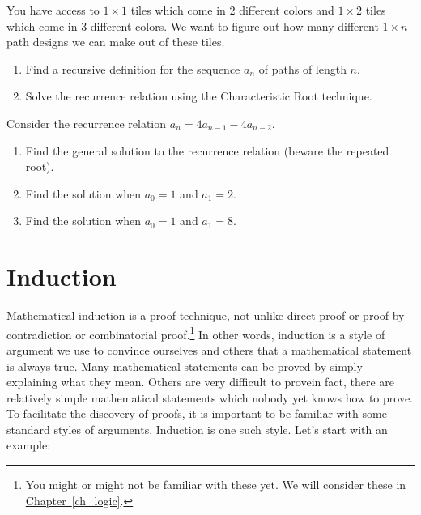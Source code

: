 \documentclass[11pt,]{book}
\theoremstyle{ptxplainnotitle}
\theoremstyle{ptxplaintitle}
\theoremstyle{ptxdefinitionnotitle}
\theoremstyle{ptxdefinitiontitle}
\theoremstyle{ptxdefinitionnotitle}
\theoremstyle{ptxdefinitiontitle}
\theoremstyle{ptxdefinitionnotitle}
\theoremstyle{ptxdefinitiontitle}
\theoremstyle{ptxdefinitiontitlenonumber}
\theoremstyle{ptxdefinitiontitlenonumber}
\numberwithin{equation}{chapter}
\begin{document}
\begin{divisionexercise}{11}\hypertarget{exercise-52}{}
\hypertarget{p-518}{}%
You have access to \(1 \times 1\) tiles which come in 2 different colors and \(1\times 2\) tiles which come in 3 different colors. We want to figure out how many different \(1 \times n\) path designs we can make out of these tiles. \leavevmode%
\begin{enumerate}[label=(\alph*)]
\item\hypertarget{li-235}{}\hypertarget{p-519}{}%
Find a recursive definition for the sequence \(a_n\) of paths of length \(n\).%
\item\hypertarget{li-236}{}\hypertarget{p-520}{}%
Solve the recurrence relation using the Characteristic Root technique.%
\end{enumerate}
%
\end{divisionexercise}%
\begin{divisionexercise}{12}\hypertarget{exercise-53}{}
\hypertarget{p-521}{}%
Consider the recurrence relation \(a_n = 4a_{n-1} - 4a_{n-2}\). \leavevmode%
\begin{enumerate}[label=(\alph*)]
\item\hypertarget{li-237}{}\hypertarget{p-522}{}%
Find the general solution to the recurrence relation (beware the repeated root). %
\item\hypertarget{li-238}{}\hypertarget{p-523}{}%
Find the solution when \(a_0 = 1\) and \(a_1 = 2\). %
\item\hypertarget{li-239}{}\hypertarget{p-524}{}%
Find the solution when \(a_0 = 1\) and \(a_1 = 8\). %
\end{enumerate}
%
\end{divisionexercise}%
\typeout{************************************************}
\typeout{************************************************}
\section[{Induction}]{Induction}\label{sec_seq-induction}
\hypertarget{p-525}{}%
 Mathematical induction is a proof technique, not unlike direct proof or proof by contradiction or combinatorial proof.\footnote{You might or might not be familiar with these yet.  We will consider these in \hyperref[ch_logic]{Chapter~\ref{ch_logic}}.\label{fn-3}} In other words, induction is a style of argument we use to convince ourselves and others that a mathematical statement is always true. Many mathematical statements can be proved by simply explaining what they mean. Others are very difficult to prove\textemdash{}in fact, there are relatively simple mathematical statements which nobody yet knows how to prove. To facilitate the discovery of proofs, it is important to be familiar with some standard styles of arguments. Induction is one such style. Let's start with an example:%
\typeout{************************************************}
\typeout{************************************************}
\end{document}
